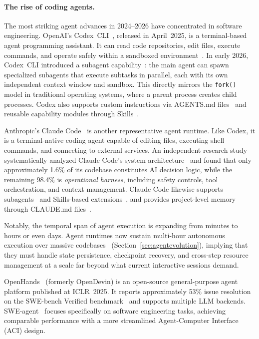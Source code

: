 \paragraph{The rise of coding agents.}
The most striking agent advances in 2024--2026 have concentrated in software engineering.
OpenAI's Codex~CLI~\cite{openai_codex_overview_2026}, released in April~2025, is a terminal-based agent programming assistant.
It can read code repositories, edit files, execute commands, and operate safely within a sandboxed environment~\cite{openai_codex_sandbox_2026}.
In early 2026, Codex~CLI introduced a subagent capability~\cite{openai_codex_overview_2026}: the main agent can spawn specialized subagents that execute subtasks in parallel, each with its own independent context window and sandbox.
This directly mirrors the \texttt{fork()} model in traditional operating systems, where a parent process creates child processes.
Codex also supports custom instructions via AGENTS.md files~\cite{openai_codex_agents_md_2026} and reusable capability modules through Skills~\cite{openai_codex_skills_2026}.

Anthropic's Claude Code~\cite{anthropic_claudecode_overview_2026} is another representative agent runtime.
Like Codex, it is a terminal-native coding agent capable of editing files, executing shell commands, and connecting to external services.
An independent research study systematically analyzed Claude Code's system architecture~\cite{dive_claudecode_2026} and found that only approximately 1.6\% of its codebase constitutes AI decision logic, while the remaining 98.4\% is \textit{operational harness}, including safety controls, tool orchestration, and context management.
Claude Code likewise supports subagents~\cite{anthropic_claudecode_subagents_2026} and Skills-based extensions~\cite{anthropic_claudecode_skills_2026}, and provides project-level memory through CLAUDE.md files~\cite{anthropic_claudecode_memory_2026}.

Notably, the temporal span of agent execution is expanding from minutes to hours or even days.
Agent runtimes now sustain multi-hour autonomous execution over massive codebases~\cite{anthropic2026agenticreport} (Section~\ref{sec:agentevolution}), implying that they must handle state persistence, checkpoint recovery, and cross-step resource management at a scale far beyond what current interactive sessions demand.

OpenHands~\cite{openhands_paper_2025} (formerly OpenDevin) is an open-source general-purpose agent platform published at ICLR~2025.
It reports approximately 53\% issue resolution on the SWE-bench Verified benchmark~\cite{openhands_paper_2025,swebench2023} and supports multiple LLM backends.
SWE-agent~\cite{sweagent2024} focuses specifically on software engineering tasks, achieving comparable performance with a more streamlined Agent-Computer Interface (ACI) design.

